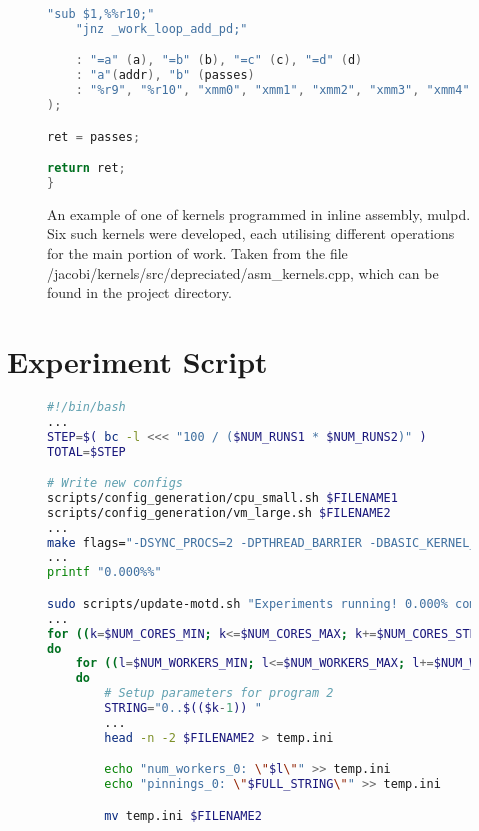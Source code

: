 \begin{appendices}
\begin{figure}
\begin{lstlisting}[language=C++]
    "sub $1,%%r10;"
    "jnz _work_loop_add_pd;"

    : "=a" (a), "=b" (b), "=c" (c), "=d" (d)
    : "a"(addr), "b" (passes)
    : "%r9", "%r10", "xmm0", "xmm1", "xmm2", "xmm3", "xmm4", "xmm5", "xmm6", "xmm7", "xmm8", "xmm9", "xmm10", "xmm11", "xmm12", "xmm13", "xmm14", "xmm15"
);

ret = passes;

return ret;
}
\end{lstlisting}
\caption{An example of one of kernels programmed in inline assembly, mulpd. Six such kernels were developed, each utilising different operations for the main portion of work. Taken from the file /jacobi/kernels/src/depreciated/asm\_kernels.cpp, which can be found in the project directory.}
\label{fig:asm_kernel}
\end{figure}



\chapter{Experiment Script}
\label{appendix:experiment_script}

\begin{figure}
\begin{lstlisting}[language=bash]
#!/bin/bash
...
STEP=$( bc -l <<< "100 / ($NUM_RUNS1 * $NUM_RUNS2)" )
TOTAL=$STEP

# Write new configs
scripts/config_generation/cpu_small.sh $FILENAME1
scripts/config_generation/vm_large.sh $FILENAME2
...
make flags="-DSYNC_PROCS=2 -DPTHREAD_BARRIER -DBASIC_KERNEL_SMALL -DVARY_KERNEL_LOAD -DEXECUTE_KERNELS -DCONVERGENCE_TEST" main | tee $LOG_FILENAME1 $LOG_FILENAME2 > /dev/null
...
printf "0.000%%"

sudo scripts/update-motd.sh "Experiments running! 0.000% complete" | tee $LOG_FILENAME1 $LOG_FILENAME2 > /dev/null
...
for ((k=$NUM_CORES_MIN; k<=$NUM_CORES_MAX; k+=$NUM_CORES_STEP))
do
    for ((l=$NUM_WORKERS_MIN; l<=$NUM_WORKERS_MAX; l+=$NUM_WORKERS_STEP))
    do
        # Setup parameters for program 2
        STRING="0..$(($k-1)) "
        ...
        head -n -2 $FILENAME2 > temp.ini

        echo "num_workers_0: \"$l\"" >> temp.ini
        echo "pinnings_0: \"$FULL_STRING\"" >> temp.ini

        mv temp.ini $FILENAME2


\end{lstlisting}
\end{figure}
\end{appendices}
